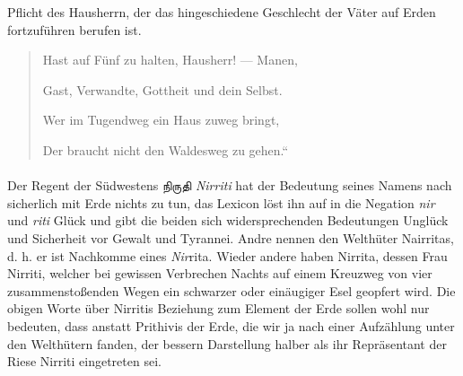 \documentclass{article}
\newcommand{\TamilText}[1]{\texttamil{#1}}
\newcommand{\tam}[1]{\TamilText{#1}}
\begin{document}
Pflicht des Hausherrn, der das hingeschiedene Geschlecht der Väter auf Erden fortzuführen berufen ist.
\begin{quotation}\small
Hast auf Fünf zu halten, Hausherr! — Manen,

Gast, Verwandte, Gottheit und dein Selbst.

Wer im Tugendweg ein Haus zuweg bringt,

Der braucht nicht den Waldesweg zu gehen.“
\end{quotation}
\paragraph{}
Der Regent der Südwestens \tam{நிருதி} \emph{Nirriti} hat der Bedeutung seines Namens nach sicherlich mit Erde nichts zu tun, das Lexicon löst ihn auf in die Negation \emph{nir} und \emph{riti} Glück und gibt die beiden sich widersprechenden Bedeutungen Unglück und Sicherheit vor Gewalt und Tyrannei. Andre nennen den Welthüter Nairritas, d. h. er ist Nachkomme eines \emph{Nir}rita. Wieder andere haben Nirrita, dessen Frau Nirriti, welcher bei gewissen Verbrechen Nachts auf einem Kreuzweg von vier zusammenstoßenden Wegen ein schwarzer oder einäugiger Esel geopfert wird. Die obigen Worte über Nirritis Beziehung zum Element der Erde sollen wohl nur bedeuten, dass anstatt Prithivis der Erde, die wir ja nach einer Aufzählung unter den Welthütern fanden, der bessern Darstellung halber als ihr Repräsentant der Riese Nirriti eingetreten sei.
\end{document}
